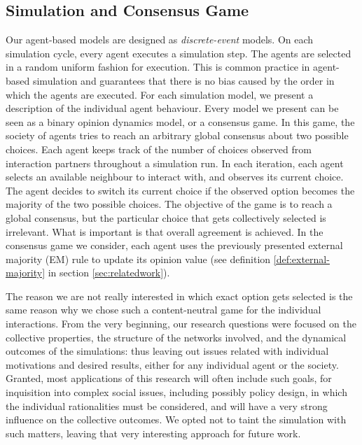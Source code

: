 \documentclass[preprint,number]{elsarticle}
\begin{document}
	\subsection{Simulation and Consensus Game}
	\label{sec:sim_consensus}
\noindent Our agent-based models are designed as \textit{discrete-event} models. On each simulation cycle, every agent executes a simulation step. The agents are selected in a random uniform fashion for execution. This is common practice in agent-based simulation and guarantees that there is no bias caused by the order in which the agents are executed. For each simulation model, we present a description of the individual agent behaviour. Every model we present can be seen as a binary opinion dynamics model, or a consensus game. In this game, the society of agents tries to reach an arbitrary global consensus about two possible choices. Each agent keeps track of the number of choices observed from interaction partners throughout a simulation run. In each iteration, each agent selects an available neighbour to interact with, and observes its current choice. The agent decides to switch its current choice if the observed option becomes the majority of the two possible choices. The objective of the game is to reach a global consensus, but the particular choice that gets collectively selected is irrelevant. What is important is that overall agreement is achieved. In the consensus game we consider, each agent uses the previously presented external majority (EM) rule to update its opinion value (see definition \ref{def:external-majority} in section \ref{sec:relatedwork}).
	
	The reason we are not really interested in which exact option gets selected is the same reason why we chose such a content-neutral game for the individual interactions. From the very beginning, our research questions were focused on the collective properties, the structure of the networks involved, and the dynamical outcomes of the simulations: thus leaving out issues related with individual motivations and desired results, either for any individual agent or the society. Granted, most applications of this research will often include such goals, for inquisition into complex social issues, including possibly policy design, in which the individual rationalities must be considered, and will have a very strong influence on the collective outcomes. We opted not to taint the simulation with such matters, leaving that very interesting approach for future work.
	
\end{document}
